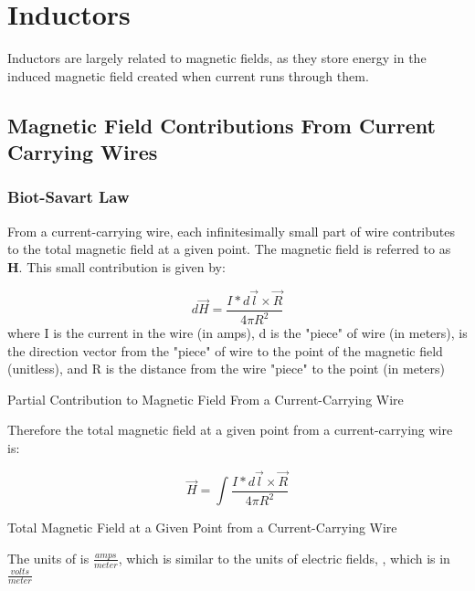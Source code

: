 \documentclass[12pt, letterpaper]{memoir}
\begin{document}
\chapter{Inductors}
Inductors are largely related to magnetic fields, as they store energy in the induced magnetic field created when current runs through them.

\section{Magnetic Field Contributions From Current Carrying Wires}

\subsection{Biot-Savart Law}
From a current-carrying wire, each infinitesimally small part of wire contributes to the total magnetic field at a given point. The magnetic field is referred to as \textbf{H}. This small contribution is given by:
\begin{eqlisting} \label{magfield1}
	\begin{equation} 
	d\overrightarrow{H} = \frac{I*d\overrightarrow{l} \times \overrightarrow{R}}{4\pi R^2}
	\end{equation}
\tiny where I is the current in the wire (in amps), d is the "piece" of wire (in meters),  is the direction vector from the "piece" of wire to the point of the magnetic field (unitless), and R is the distance from the wire "piece" to the point (in meters)

\caption{\scriptsize Partial Contribution to Magnetic Field From a Current-Carrying Wire}
\end{eqlisting}


Therefore the total magnetic field at a given point from a current-carrying wire is:

\begin{eqlisting} \label{magfield2}
	\begin{equation}
	\overrightarrow{H} = \int \! \frac{I*d\overrightarrow{l} \times \overrightarrow{R}}{4 \pi R^2}
	\end{equation}
\caption{\scriptsize Total Magnetic Field at a Given Point from a Current-Carrying Wire}
\end{eqlisting}

The units of \textbf{} is $\frac{amps}{meter}$, which is similar to the units of electric fields, \textbf{}, which is in $\frac{volts}{meter}$
\end{document}
